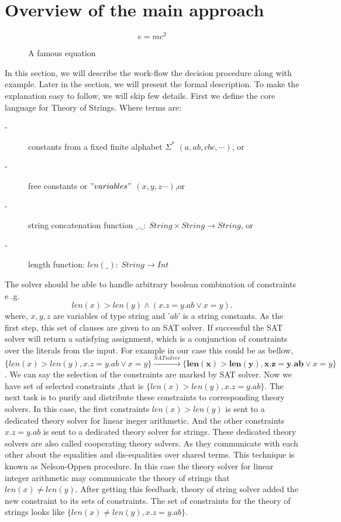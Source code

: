 
\section{Overview of the main approach}
\label{sec:overview}



\begin{figure}
\[ e = m c^2 \]
\caption{A famous equation}
\end{figure}

In this section, we will describe the work-flow the decision procedure along with example.
Later in the section, we will present the formal description. To make the explanation easy to follow, we will skip few details.  
First we define the core language for Theory of Strings. Where terms are:
\begin{description}
	\item[-] constants from a fixed finite alphabet \( \Sigma^*\)   \( (a, ab,cbc,\cdots )\), or	
	\item[-] free constants or \("variables"\) \( (x, y,z\cdots )\),or	
	\item[-] string concatenation function \( \_.\_ : \ String \times String \to String  \), or
    \item[-] length function:  \( len(\_): \ String \to Int  \)
\end{description}
The solver should be able to handle arbitrary boolean combination of constraints e .g.
	\[       len(x) > len(y)  \wedge ( x.z = y.ab \vee x = y). \]
	where, \( x, y, z\) are variables of type string and  '\(ab\)' is a string constants. As the first step, this set of clauses are given to an SAT solver. If successful  the SAT solver will return a satisfying assignment, which is a conjunction of constraints over the literals from the input. For example in our case this could be as bellow, 
	\[     \{ len(x) > len(y) ,  x.z = y.ab \vee x = y \}\xrightarrow{SAT solver} \{ \mathbf{ len(x) > len(y)} ,  \mathbf{x.z = y.ab} \vee x = y \} \].
	We can say the selection of the constraints are marked by SAT solver. Now we have set of selected constraints ,that is \( \{ len(x) > len(y) ,  x.z = y.ab \}\). The next task is to purify and distribute these constraints to corresponding theory solvers. In this case, the first constraints \(len(x) > len(y)\) is sent to a dedicated theory solver for linear ineger arithmetic. And the other constraints \( x.z = y.ab \)  is sent to a dedicated theory solver for strings. These dedicated theory solvers are also called cooperating theory solvers. As they communicate with each other about the equalities and dis-equalities over shared terms. This technique is known as Nelson-Oppen procedure. In this case the theory solver for linear integer arithmetic may communicate the theory of strings that \(len(x) \neq len(y)\). After getting this feedback, theory of string solver added the new constraint to its sets of constraints. The set of constraints for the theory of strings looks like 
	\( \{ len(x) \neq len(y) ,  x.z = y.ab \}\).
	
